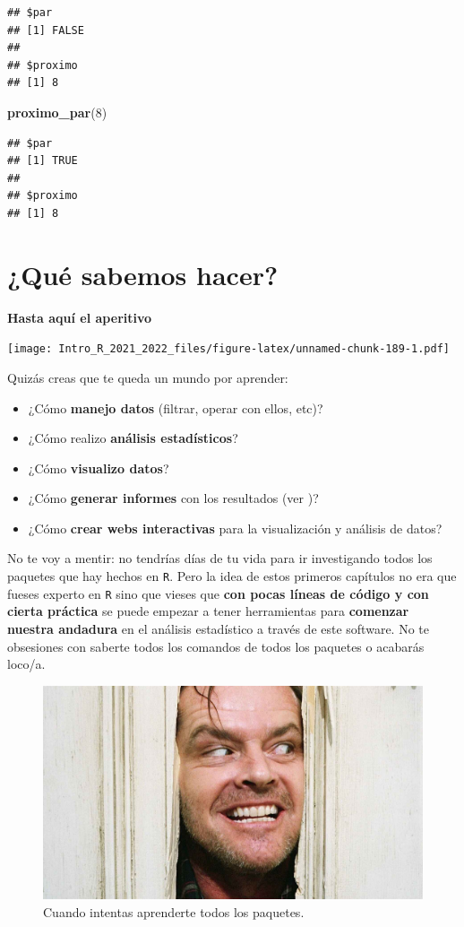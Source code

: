 \documentclass[11pt,]{book}
\newenvironment{Shaded}{\begin{snugshade}}{\end{snugshade}}
\newcommand{\DecValTok}[1]{\textcolor[rgb]{0.06,0.06,0.06}{#1}}
\newcommand{\KeywordTok}[1]{\textcolor[rgb]{0.27,0.27,0.27}{\textbf{#1}}}
\newcommand{\NormalTok}[1]{#1}
\providecommand{\tightlist}{%
  \setlength{\itemsep}{0pt}\setlength{\parskip}{0pt}}
\begin{document}
\begin{verbatim}
## $par
## [1] FALSE
## 
## $proximo
## [1] 8
\end{verbatim}

\begin{Shaded}
\begin{Highlighting}[]
\KeywordTok{proximo_par}\NormalTok{(}\DecValTok{8}\NormalTok{)}
\end{Highlighting}
\end{Shaded}

\begin{verbatim}
## $par
## [1] TRUE
## 
## $proximo
## [1] 8
\end{verbatim}

\hypertarget{quuxe9-sabemos-hacer}{%
\chapter{¿Qué sabemos hacer?}\label{quuxe9-sabemos-hacer}}

\textbf{Hasta aquí el aperitivo}

\texttt{[image: Intro\_R\_2021\_2022\_files/figure-latex/unnamed-chunk-189-1.pdf]}

Quizás creas que te queda un mundo por aprender:

\begin{itemize}
\tightlist
\item
  ¿Cómo \textbf{manejo datos} (filtrar, operar con ellos, etc)?
\item
  ¿Cómo realizo \textbf{análisis estadísticos}?
\item
  ¿Cómo \textbf{visualizo datos}?
\item
  ¿Cómo \textbf{generar informes} con los resultados (ver \citep{xie2015})?
\item
  ¿Cómo \textbf{crear webs interactivas} para la visualización y análisis de datos?
\end{itemize}

No te voy a mentir: no tendrías días de tu vida para ir investigando todos los paquetes que hay hechos en \texttt{R}. Pero la idea de estos primeros capítulos no era que fueses experto en \texttt{R} sino que vieses que \textbf{con pocas líneas de código y con cierta práctica} se puede empezar a tener herramientas para \textbf{comenzar nuestra andadura} en el análisis estadístico a través de este software. No te obsesiones con saberte todos los comandos de todos los paquetes o acabarás loco/a.

\begin{figure}

{\centering \includegraphics[width=0.5\linewidth]{./img/stanley_kubrick} 

}

\caption{Cuando intentas aprenderte todos los paquetes.}\label{fig:unnamed-chunk-190}
\end{figure}
\end{document}
